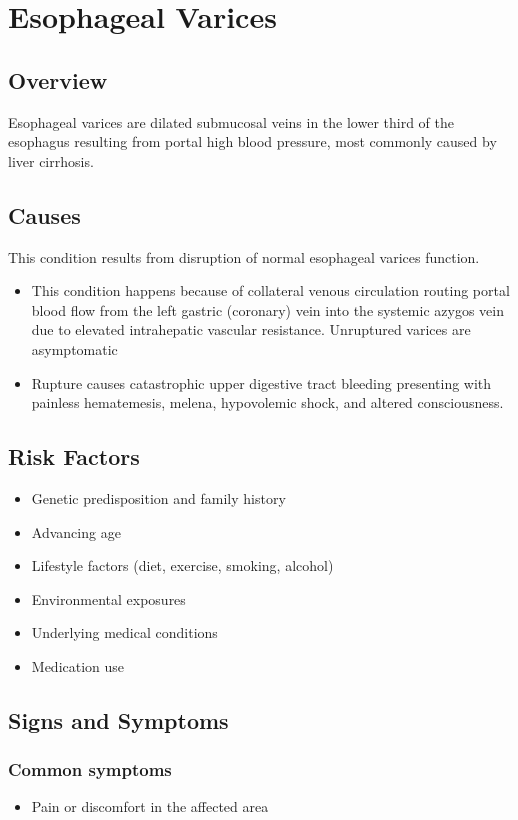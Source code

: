 \chapter{Esophageal Varices}
\label{sec:Esophageal Varices}

\section{Overview}
Esophageal varices are dilated submucosal veins in the lower third of the esophagus resulting from portal high blood pressure, most commonly caused by liver cirrhosis.
\section{Causes}
This condition results from disruption of normal esophageal varices function.

\begin{itemize}[noitemsep]
  \item This condition happens because of collateral venous circulation routing portal blood flow from the left gastric (coronary) vein into the systemic azygos vein due to elevated intrahepatic vascular resistance. Unruptured varices are asymptomatic
  \item Rupture causes catastrophic upper digestive tract bleeding presenting with painless hematemesis, melena, hypovolemic shock, and altered consciousness.
\end{itemize}
\section{Risk Factors}


\begin{itemize}[noitemsep]
  \item Genetic predisposition and family history
  \item Advancing age
  \item Lifestyle factors (diet, exercise, smoking, alcohol)
  \item Environmental exposures
  \item Underlying medical conditions
  \item Medication use
\end{itemize}
\section{Signs and Symptoms}

\subsection{Common symptoms}
\begin{itemize}[noitemsep]
  \item Pain or discomfort in the affected area
  \end{itemize}

